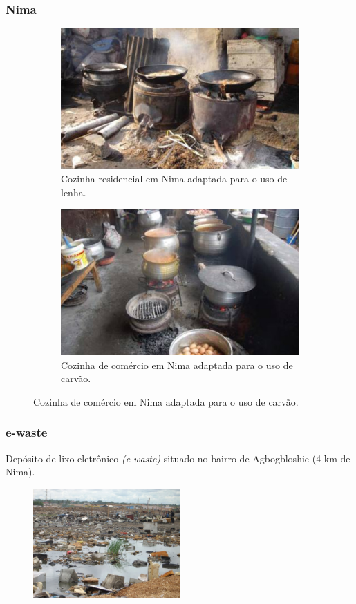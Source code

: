 \begin{frame}
	\frametitle{Nima}
	\begin{figure}[H]
		\centering
		\begin{subfigure}[b]{0.4\linewidth}
			\includegraphics[width=\linewidth]{../../inputs/images/zheng/arku1.jpeg}
			\caption{Cozinha residencial em Nima adaptada para o uso de lenha.}
		\end{subfigure}%
		\hspace{0.5cm}
		\begin{subfigure}[b]{0.4\linewidth}
			\includegraphics[width=\linewidth]{../../inputs/images/zheng/arku2.jpeg}
			\caption{Cozinha de comércio em Nima adaptada para o uso de carvão.}
		\end{subfigure}
	\end{figure}
\end{frame}

\begin{frame}
  \frametitle{e-waste}
  Depósito de lixo eletrônico \textit{(e-waste)} situado no bairro 
  de Agbogbloshie (4 km de Nima).
  \begin{figure}[H]
    \centering
    \includegraphics[width=0.5\textwidth]{../../inputs/images/ewaste_jack_caravano.jpg}
  \end{figure}
\end{frame}
